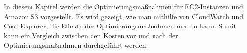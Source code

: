 In diesem Kapitel werden die Optimierungsmaßnahmen für EC2-Instanzen und Amazon S3 vorgestellt. Es wird gezeigt, wie man mithilfe von CloudWatch und Cost-Explorer, die Effekte der Optimierungsmaßnahmen messen kann. Somit kann ein Vergleich zwischen den Kosten vor und nach der Optimierungsmaßnahmen durchgeführt werden.

